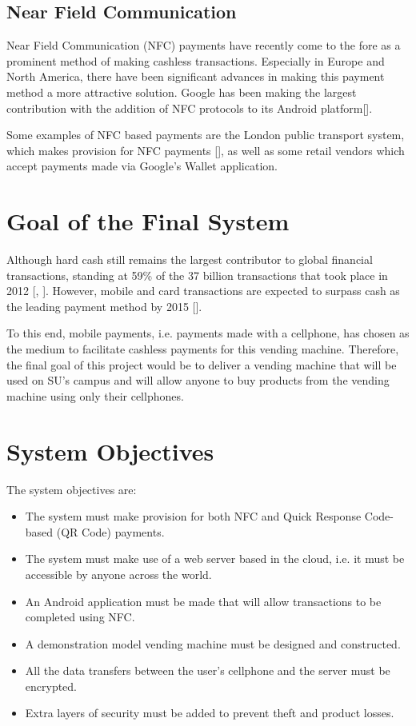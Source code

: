 \subsection{Near Field Communication}

Near Field Communication (NFC) payments have recently come to the fore as a
prominent method of making cashless transactions. Especially in Europe and North
America, there have been significant advances in making this payment method a
more attractive solution. Google has been making the largest contribution with
the addition of NFC protocols to its Android
platform[\cite{website:android-gingerbread}].

Some examples of NFC based payments are the London public transport system, which makes
provision for NFC payments [\cite{article:nfc-underground}], as well as some retail vendors
which accept payments made via Google's Wallet application.

\section{Goal of the Final System}
\label{sec:final-system-goal}

Although hard cash still remains the largest contributor to global financial transactions,
standing at 59\% of the 37 billion transactions that took place in 2012
[\cite{article:money-transactions}, \cite{website:money-transactions}]. However,
mobile and card transactions are expected to surpass cash as the leading
payment method by 2015 [\cite{article:cashless-transactions}].

To this end, mobile payments, i.e. payments made with a cellphone, has chosen
as the medium to facilitate cashless payments for this vending machine.
Therefore, the final goal of this project would be to deliver a vending machine
that will be used on SU's campus and will allow anyone to buy products from
the vending machine using only their cellphones.

\section{System Objectives}
\label{sec:objectives}

The system objectives are:

\begin{itemize}
  \item The system must make provision for both NFC and Quick Response Code-based (QR
  Code) payments.
  \item The system must make use of a web server based in the cloud, i.e. it
  must be accessible by anyone across the world.
  \item An Android application must be made that will allow transactions to be completed
  using NFC.
  \item A demonstration model vending machine must be designed and constructed.
  \item All the data transfers between the user's cellphone and the server must be
  encrypted.
  \item Extra layers of security must be added to prevent theft and product
  losses.
\end{itemize}

